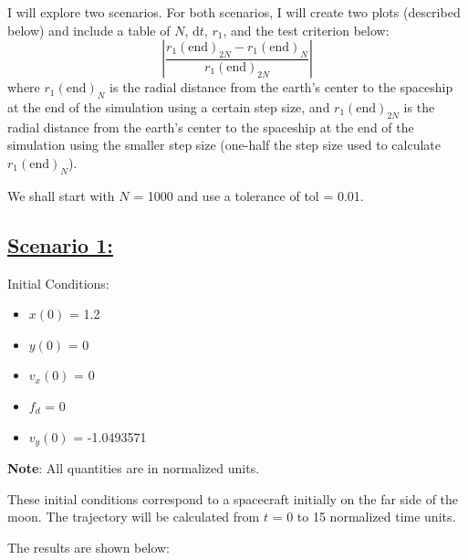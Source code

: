\documentclass{article}
\begin{document}
\vspace{\baselineskip}

I will explore two scenarios. For both scenarios, I will create two plots (described below) and include a table of $N$, $\textrm{d}t$, $r_1$, and the test criterion below:
\color{cyan}
\begin{equation*}
    \left|\frac{r_1(\textrm{end})_{2N} - r_1(\textrm{end})_N}{r_1(\textrm{end})_{2N}}\right|
\end{equation*}
\color{white}
where $r_1(\textrm{end})_N$ is the radial distance from the earth’s center to the spaceship at the end of the simulation using a certain step size, and $r_1(\textrm{end})_{2N}$ is the radial distance from the earth’s center to the spaceship at the end of the simulation using the smaller step size (one-half the step size used to calculate $r_1(\textrm{end})_N$).

\vspace{\baselineskip}

We shall start with $N$ = 1000 and use a tolerance of tol = 0.01.

\pagebreak

\subsection*{\underline{Scenario 1:}}

Initial Conditions:
\begin{multicols}{4}
    \begin{itemize}
        \item $x(0)$ = 1.2
        \item $y(0)$ = 0
        \item $v_x(0)$ = 0
        \item $f_d$ = 0
        \item $v_y(0)$ = -1.0493571
    \end{itemize}
\end{multicols}

\textbf{Note}: All quantities are in normalized units.

\vspace{\baselineskip}

These initial conditions correspond to a spacecraft initially on the far side of the moon. The trajectory will be calculated from $t$ = 0 to 15 normalized time units.

\vspace{\baselineskip}

The results are shown below:
\end{document}
